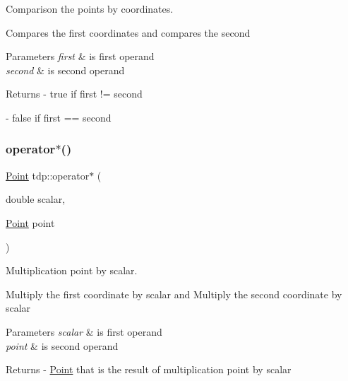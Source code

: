 Comparison the points by coordinates. 

Compares the first coordinates and compares the second 
\begin{DoxyParams}{Parameters}
{\em first} & is first operand \\
\hline
{\em second} & is second operand \\
\hline
\end{DoxyParams}
\begin{DoxyReturn}{Returns}
-\/ true if \textquotesingle{}first\textquotesingle{} != \textquotesingle{}second\textquotesingle{} 

-\/ false if \textquotesingle{}first\textquotesingle{} == \textquotesingle{}second\textquotesingle{} 
\end{DoxyReturn}
\mbox{\label{namespacetdp_a291c69f1bd3cf68f5c2b68fc3ab37f3a}} 
\subsubsection{\texorpdfstring{operator$\ast$()}{operator*()}}
{\footnotesize\ttfamily \mbox{\hyperlink{structtdp_1_1_point}{Point}} tdp\+::operator$\ast$ (\begin{DoxyParamCaption}\item[{double}]{scalar,  }\item[{\mbox{\hyperlink{structtdp_1_1_point}{Point}}}]{point }\end{DoxyParamCaption})}



Multiplication point by scalar. 

Multiply the first coordinate by scalar and Multiply the second coordinate by scalar 
\begin{DoxyParams}{Parameters}
{\em scalar} & is first operand \\
\hline
{\em point} & is second operand \\
\hline
\end{DoxyParams}
\begin{DoxyReturn}{Returns}
-\/ \mbox{\hyperlink{structtdp_1_1_point}{Point}} that is the result of multiplication point by scalar 
\end{DoxyReturn}
\mbox{\label{namespacetdp_a34cf3e1ef508e6a115b6c1d24a5dbb5d}} 
